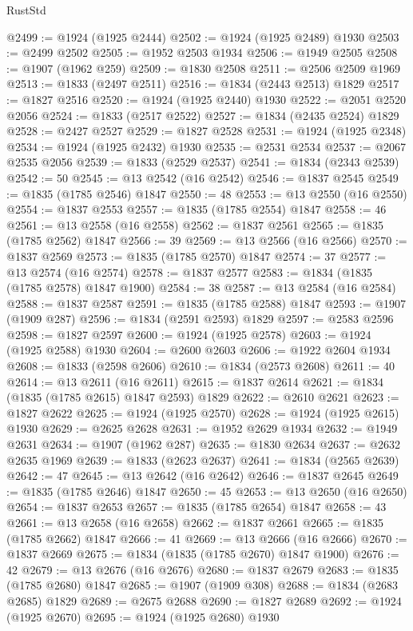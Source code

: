 \begin{lexlean}{RustStd}
\begin{coremodule}
@2499 := @1924 (@1925 @2444)
@2502 := @1924 (@1925 @2489) @1930
@2503 := @2499 @2502
@2505 := @1952 @2503 @1934
@2506 := @1949 @2505
@2508 := @1907 (@1962 @259)
@2509 := @1830 @2508
@2511 := @2506 @2509 @1969
@2513 := @1833 (@2497 @2511)
@2516 := @1834 (@2443 @2513) @1829
@2517 := @1827 @2516
@2520 := @1924 (@1925 @2440) @1930
@2522 := @2051 @2520 @2056
@2524 := @1833 (@2517 @2522)
@2527 := @1834 (@2435 @2524) @1829
@2528 := @2427 @2527
@2529 := @1827 @2528
@2531 := @1924 (@1925 @2348)
@2534 := @1924 (@1925 @2432) @1930
@2535 := @2531 @2534
@2537 := @2067 @2535 @2056
@2539 := @1833 (@2529 @2537)
@2541 := @1834 (@2343 @2539)
@2542 := 50
@2545 := @13 @2542 (@16 @2542)
@2546 := @1837 @2545
@2549 := @1835 (@1785 @2546) @1847
@2550 := 48
@2553 := @13 @2550 (@16 @2550)
@2554 := @1837 @2553
@2557 := @1835 (@1785 @2554) @1847
@2558 := 46
@2561 := @13 @2558 (@16 @2558)
@2562 := @1837 @2561
@2565 := @1835 (@1785 @2562) @1847
@2566 := 39
@2569 := @13 @2566 (@16 @2566)
@2570 := @1837 @2569
@2573 := @1835 (@1785 @2570) @1847
@2574 := 37
@2577 := @13 @2574 (@16 @2574)
@2578 := @1837 @2577
@2583 := @1834 (@1835 (@1785 @2578) @1847 @1900)
@2584 := 38
@2587 := @13 @2584 (@16 @2584)
@2588 := @1837 @2587
@2591 := @1835 (@1785 @2588) @1847
@2593 := @1907 (@1909 @287)
@2596 := @1834 (@2591 @2593) @1829
@2597 := @2583 @2596
@2598 := @1827 @2597
@2600 := @1924 (@1925 @2578)
@2603 := @1924 (@1925 @2588) @1930
@2604 := @2600 @2603
@2606 := @1922 @2604 @1934
@2608 := @1833 (@2598 @2606)
@2610 := @1834 (@2573 @2608)
@2611 := 40
@2614 := @13 @2611 (@16 @2611)
@2615 := @1837 @2614
@2621 := @1834 (@1835 (@1785 @2615) @1847 @2593) @1829
@2622 := @2610 @2621
@2623 := @1827 @2622
@2625 := @1924 (@1925 @2570)
@2628 := @1924 (@1925 @2615) @1930
@2629 := @2625 @2628
@2631 := @1952 @2629 @1934
@2632 := @1949 @2631
@2634 := @1907 (@1962 @287)
@2635 := @1830 @2634
@2637 := @2632 @2635 @1969
@2639 := @1833 (@2623 @2637)
@2641 := @1834 (@2565 @2639)
@2642 := 47
@2645 := @13 @2642 (@16 @2642)
@2646 := @1837 @2645
@2649 := @1835 (@1785 @2646) @1847
@2650 := 45
@2653 := @13 @2650 (@16 @2650)
@2654 := @1837 @2653
@2657 := @1835 (@1785 @2654) @1847
@2658 := 43
@2661 := @13 @2658 (@16 @2658)
@2662 := @1837 @2661
@2665 := @1835 (@1785 @2662) @1847
@2666 := 41
@2669 := @13 @2666 (@16 @2666)
@2670 := @1837 @2669
@2675 := @1834 (@1835 (@1785 @2670) @1847 @1900)
@2676 := 42
@2679 := @13 @2676 (@16 @2676)
@2680 := @1837 @2679
@2683 := @1835 (@1785 @2680) @1847
@2685 := @1907 (@1909 @308)
@2688 := @1834 (@2683 @2685) @1829
@2689 := @2675 @2688
@2690 := @1827 @2689
@2692 := @1924 (@1925 @2670)
@2695 := @1924 (@1925 @2680) @1930

\end{coremodule}
\end{lexlean}
